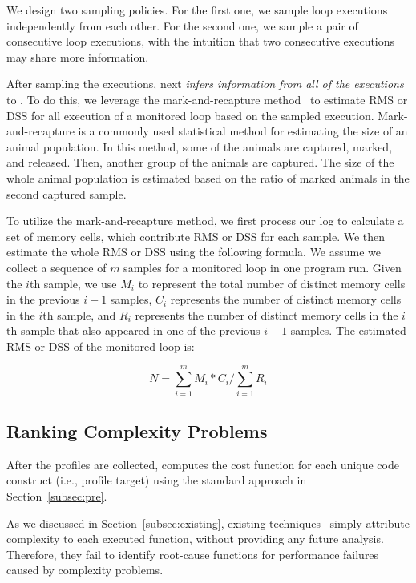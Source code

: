 We design two sampling policies. 
For the first one, we sample loop executions independently from each other.
For the second one, we sample a pair of consecutive loop executions, 
with the intuition that two consecutive 
executions may share more information.


After sampling the executions, \Tool next \emph{infers information
from all of the executions} to .  
 To do this, we leverage the mark-and-recapture method~\cite{mark-recapture} to 
estimate RMS or DSS for all execution of a monitored loop 
based on the sampled execution. 
Mark-and-recapture is a commonly used statistical method 
for estimating the size of an animal population. 
In this method, some of the animals are captured, marked, and released. 
Then, another group of the animals are captured.
The size of the whole animal population is estimated 
based on the ratio of marked animals in the second captured sample.  

To utilize the mark-and-recapture method, 
we first process our log to calculate a set of memory cells, 
which contribute RMS
or DSS for each sample. 
We then estimate the whole RMS or DSS using the following formula.
We assume we collect a sequence of $m$ samples for a monitored loop 
in one program run.
Given the $i$th sample, we use $M_i$ to represent the 
total number of distinct memory cells in the previous $i-1$ samples, 
$C_i$ represents the number of distinct memory cells in the $i$th sample,
and $R_i$ represents the number of distinct memory cells in 
the $i$th sample that also appeared in one of the previous $i-1$ samples.
The estimated RMS or DSS of  the monitored loop is:

\begin{equation} \label{eq:mark}
N = \sum\limits_{i=1}^m M_i*C_i\Big/\sum\limits_{i=1}^m R_i
\end{equation}

\subsection{Ranking Complexity Problems}

After the profiles are collected, \Tool computes
the cost function for each unique code construct
(i.e., profile target) using the standard approach
in Section~\ref{subsec:pre}. 
 
As we discussed in Section~\ref{subsec:existing}, 
existing techniques~\cite{Aprof1,Aprof2,AlgoProf} 
simply attribute complexity to each executed function, 
without providing any future analysis. 
Therefore, they fail to identify root-cause functions for 
performance failures caused by complexity problems. 

